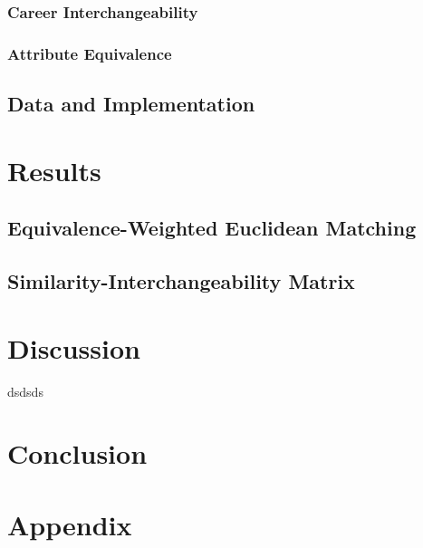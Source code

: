 \documentclass{article}
\begin{document}
\subsubsection{Career Interchangeability}
\InterchangeabilityFunction

\subsubsection{Attribute Equivalence}
\AttributeEquivalence

\subsection{Data and Implementation}

\section{Results}
\subsection{Equivalence-Weighted Euclidean Matching}

\subsection{Similarity-Interchangeability Matrix}


\section{Discussion}
dsdsds \parencite[]{dsdsds}


\section{Conclusion} 


\newpage
\printbibliography[
    heading=bibintoc,
    title={References}
]


\newpage
\section*{Appendix}



\end{document}
